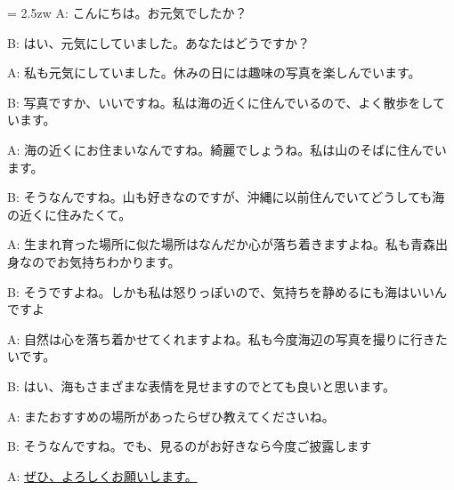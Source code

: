 \documentclass[11pt]{amsart}
\title{}
\author{}
\newenvironment{hangall}[1]{\hangindent = 2.5zw\everypar{\hangindent = 2.5zw}}{}
\begin{document}
\maketitle
\begin{hangall}{}%
A: こんにちは。お元気でしたか？

B: はい、元気にしていました。あなたはどうですか？

A: 私も元気にしていました。休みの日には趣味の写真を楽しんでいます。

B: 写真ですか、いいですね。私は海の近くに住んでいるので、よく散歩をしています。

A: 海の近くにお住まいなんですね。綺麗でしょうね。私は山のそばに住んでいます。

B: そうなんですね。山も好きなのですが、沖縄に以前住んでいてどうしても海の近くに住みたくて。

A: 生まれ育った場所に似た場所はなんだか心が落ち着きますよね。私も青森出身なのでお気持ちわかります。

B: そうですよね。しかも私は怒りっぽいので、気持ちを静めるにも海はいいんですよ

A: 自然は心を落ち着かせてくれますよね。私も今度海辺の写真を撮りに行きたいです。

B: はい、海もさまざまな表情を見せますのでとても良いと思います。

A: またおすすめの場所があったらぜひ教えてくださいね。

B: そうなんですね。でも、見るのがお好きなら今度ご披露します

A: \ul{ぜひ、よろしくお願いします。}\end{hangall}
\end{document}
